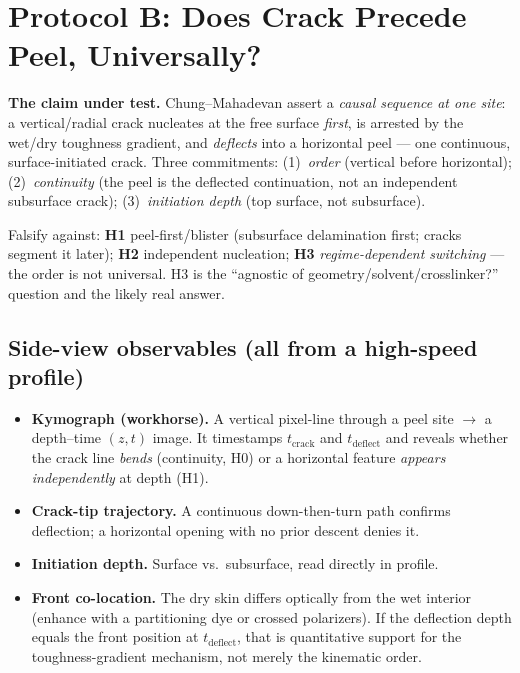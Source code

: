 \documentclass[12pt,letterpaper]{article}
\begin{document}
\section{Protocol B: Does Crack Precede Peel, Universally?}
\label{sec:mech}
\begin{reviewbox}
\textbf{The claim under test.} Chung--Mahadevan assert a \emph{causal sequence at
one site}: a vertical/radial crack nucleates at the free surface \emph{first}, is
arrested by the wet/dry toughness gradient, and \emph{deflects} into a horizontal
peel --- one continuous, surface-initiated crack. Three commitments:
(1)~\emph{order} (vertical before horizontal); (2)~\emph{continuity} (the peel is
the deflected continuation, not an independent subsurface crack);
(3)~\emph{initiation depth} (top surface, not subsurface).
\end{reviewbox}

\noindent Falsify against: \textbf{H1} peel-first/blister (subsurface delamination
first; cracks segment it later); \textbf{H2} independent nucleation; \textbf{H3}
\emph{regime-dependent switching} --- the order is not universal. H3 is the
``agnostic of geometry/solvent/crosslinker?'' question and the likely real
answer.

\subsection{Side-view observables (all from a high-speed profile)}
\begin{itemize}[leftmargin=1.4em,itemsep=1pt]
\item \textbf{Kymograph (workhorse).} A vertical pixel-line through a peel site
$\to$ a depth--time $(z,t)$ image. It timestamps $t_{\text{crack}}$ and
$t_{\text{deflect}}$ and reveals whether the crack line \emph{bends}
(continuity, H0) or a horizontal feature \emph{appears independently} at depth
(H1).
\item \textbf{Crack-tip trajectory.} A continuous down-then-turn path confirms
deflection; a horizontal opening with no prior descent denies it.
\item \textbf{Initiation depth.} Surface vs.\ subsurface, read directly in
profile.
\item \textbf{Front co-location.} The dry skin differs optically from the wet
interior (enhance with a partitioning dye or crossed polarizers). If the
deflection depth equals the front position at $t_{\text{deflect}}$, that is
quantitative support for the toughness-gradient mechanism, not merely the
kinematic order.
\end{itemize}
\end{document}
